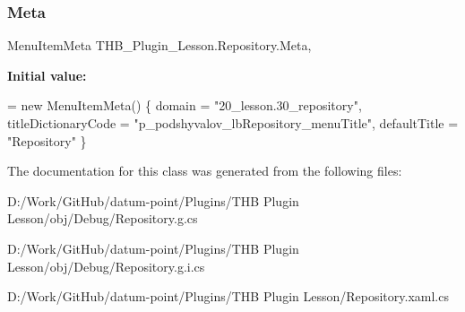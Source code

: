 \subsubsection{\texorpdfstring{Meta}{Meta}}
{\footnotesize\ttfamily Menu\+Item\+Meta T\+H\+B\+\_\+\+Plugin\+\_\+\+Lesson.\+Repository.\+Meta\hspace{0.3cm}{\ttfamily [get]}, {\ttfamily [set]}}

{\bfseries Initial value\+:}
\begin{DoxyCode}
= \textcolor{keyword}{new} MenuItemMeta()
        \{
            domain = \textcolor{stringliteral}{"20\_lesson.30\_repository"},
            titleDictionaryCode = \textcolor{stringliteral}{"p\_podshyvalov\_lbRepository\_menuTitle"},
            defaultTitle = \textcolor{stringliteral}{"Repository"}
        \}
\end{DoxyCode}


The documentation for this class was generated from the following files\+:\begin{DoxyCompactItemize}
\item 
D\+:/\+Work/\+Git\+Hub/datum-\/point/\+Plugins/\+T\+H\+B Plugin Lesson/obj/\+Debug/Repository.\+g.\+cs\item 
D\+:/\+Work/\+Git\+Hub/datum-\/point/\+Plugins/\+T\+H\+B Plugin Lesson/obj/\+Debug/Repository.\+g.\+i.\+cs\item 
D\+:/\+Work/\+Git\+Hub/datum-\/point/\+Plugins/\+T\+H\+B Plugin Lesson/Repository.\+xaml.\+cs\end{DoxyCompactItemize}

